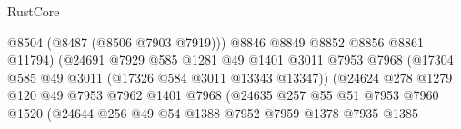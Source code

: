 \begin{lexlean}{RustCore}
\begin{coremodule}
                                                @8504
                                                (@8487 (@8506 @7903 @7919)))
                                              @8846
                                              @8849
                                              @8852
                                              @8856
                                              @8861
                                              @11794)
                                            (@24691
                                              @7929
                                              @585
                                              @1281
                                              @49
                                              @1401
                                              @3011
                                              @7953
                                              @7968
                                              (@17304
                                                @585
                                                @49
                                                @3011
                                                (@17326 @584 @3011 @13343 @13347))
                                              (@24624
                                                @278
                                                @1279
                                                @120
                                                @49
                                                @7953
                                                @7962
                                                @1401
                                                @7968
                                                (@24635
                                                  @257
                                                  @55
                                                  @51
                                                  @7953
                                                  @7960
                                                  @1520
                                                  (@24644
                                                    @256
                                                    @49
                                                    @54
                                                    @1388
                                                    @7952
                                                    @7959
                                                    @1378
                                                    @7935
                                                    @1385

\end{coremodule}
\end{lexlean}
